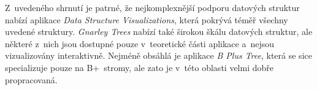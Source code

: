 \begin{table}[H]
    \centering
    \caption{Podporované datové struktury v~analyzovaných aplikacích}
    \label{tab:other_apps_ds_structures}
\end{table}

Z~uvedeného shrnutí je patrné, že nejkomplexnější podporu datových struktur nabízí aplikace \textit{Data Structure Visualizations}, která pokrývá téměř všechny uvedené struktury.
\textit{Gnarley Trees} nabízí také širokou škálu datových struktur, ale některé z~nich jsou dostupné pouze v~teoretické části aplikace a~nejsou vizualizovány interaktivně.
Nejméně obsáhlá je aplikace \textit{B Plus Tree}, která se sice specializuje pouze na B+~stromy, ale zato je v~této oblasti velmi dobře propracovaná.

